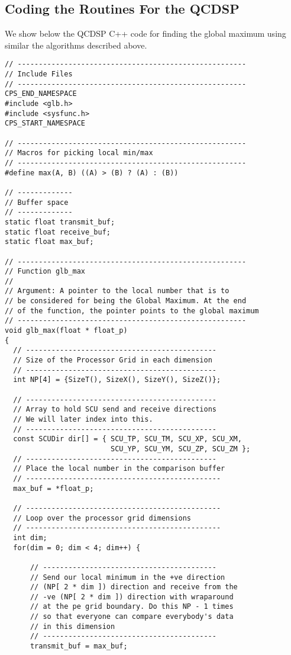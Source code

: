 \subsection{Coding the Routines For the QCDSP}
We show below the QCDSP C++ code for finding the global maximum
using similar the algorithms described above.
\begin{verbatim}
// ------------------------------------------------------
// Include Files
// ------------------------------------------------------
CPS_END_NAMESPACE
#include <glb.h>
#include <sysfunc.h>
CPS_START_NAMESPACE

// ------------------------------------------------------
// Macros for picking local min/max
// ------------------------------------------------------
#define max(A, B) ((A) > (B) ? (A) : (B))

// -------------
// Buffer space 
// -------------
static float transmit_buf;
static float receive_buf;
static float max_buf;

// ------------------------------------------------------
// Function glb_max
//
// Argument: A pointer to the local number that is to
// be considered for being the Global Maximum. At the end
// of the function, the pointer points to the global maximum
// ------------------------------------------------------
void glb_max(float * float_p)
{
  // ---------------------------------------------
  // Size of the Processor Grid in each dimension
  // ---------------------------------------------
  int NP[4] = {SizeT(), SizeX(), SizeY(), SizeZ()};

  // ---------------------------------------------
  // Array to hold SCU send and receive directions
  // We will later index into this.
  // ---------------------------------------------
  const SCUDir dir[] = { SCU_TP, SCU_TM, SCU_XP, SCU_XM,
                         SCU_YP, SCU_YM, SCU_ZP, SCU_ZM };
  // ---------------------------------------------
  // Place the local number in the comparison buffer
  // ----------------------------------------------
  max_buf = *float_p;

  // ----------------------------------------------
  // Loop over the processor grid dimensions
  // ----------------------------------------------
  int dim;
  for(dim = 0; dim < 4; dim++) {

      // -----------------------------------------
      // Send our local minimum in the +ve direction
      // (NP[ 2 * dim ]) direction and receive from the
      // -ve (NP[ 2 * dim ]) direction with wraparound
      // at the pe grid boundary. Do this NP - 1 times
      // so that everyone can compare everybody's data
      // in this dimension
      // -----------------------------------------
      transmit_buf = max_buf;


\end{verbatim}
